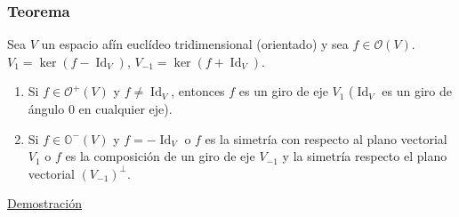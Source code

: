 \documentclass[12pt, a4paper, ones, notitlepage, openany,titlepage]{article}
\newcommand{\demostracion}{\noindent\underline{Demostración}}
\begin{document}
\subsubsection{Teorema}
Sea $V$ un espacio afín euclídeo tridimensional (orientado) y sea $f \in \mathcal{O}(V)$. $V_1 = \ker (f-\operatorname{Id}_V)$, $V_{-1} = \ker (f+\operatorname{Id}_V)$.
\begin{enumerate}[label=(\arabic*)]
	\item Si $f \in \mathcal{O}^+(V)$ y $f \neq \operatorname{Id}_V$, entonces $f$ es un giro de eje $V_1$ ($\operatorname{Id}_V$ es un giro de ángulo $0$ en cualquier eje).
	\item Si $f \in \mathbb{O}^-(V)$ y $f = -\operatorname{Id}_V$ o $f$ es la simetría con respecto al plano vectorial $V_1$ o $f$ es la composición de un giro de eje $V_{-1}$ y la simetría respecto el plano vectorial $(V_{-1})^\perp$.
\end{enumerate}
\demostracion
\end{document}
